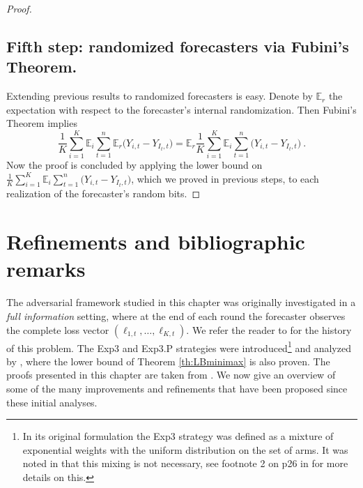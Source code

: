 \documentclass[11pt]{hackednow}
\newcommand{\E}{\mathbb{E}}
\begin{document}
\begin{proof}
\subsection*{Fifth step: randomized forecasters via Fubini's Theorem.}
%
Extending previous results to randomized forecasters is easy. Denote by $\E_r$ the expectation with respect to the forecaster's internal randomization. Then Fubini's Theorem implies
$$
\frac{1}{K} \sum_{i=1}^K \E_i\sum_{t=1}^n \E_r\bigl(Y_{i,t} - Y_{I_t,t}\bigr) = \E_r \frac{1}{K} \sum_{i=1}^K \E_i \sum_{t=1}^n \bigl(Y_{i,t} - Y_{I_t,t}\bigr)~.$$
Now the proof is concluded by applying the lower bound on $\tfrac{1}{K} \sum_{i=1}^K \E_i \sum_{t=1}^n \bigl(Y_{i,t} - Y_{I_t,t}\bigr)$, which we proved in previous steps, to each realization of the forecaster's random bits.
\end{proof}

\section{Refinements and bibliographic remarks}
The adversarial framework studied in this chapter was originally investigated in a {\em full information} setting, where at the end of each round the forecaster observes the complete loss vector $(\ell_{1,t}, \hdots, \ell_{K,t})$. We refer the reader to \cite{CL06} for the history of this problem. The Exp3 and Exp3.P strategies were introduced\footnote{In its original formulation the Exp3 strategy was defined as a mixture of exponential weights with the uniform distribution on the set of arms. It was noted in \cite{Sto05} that this mixing is not necessary, see footnote 2 on p26 in \cite{Bub10} for more details on this.} and analyzed by \cite{ACFS03}, where the lower bound of Theorem \ref{th:LBminimax} is also proven. The proofs presented in this chapter are taken from \cite{Bub10}. We now give an overview of some of the many improvements and refinements that have been proposed since these initial analyses.
\end{document}
